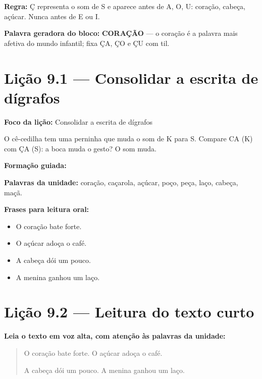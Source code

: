 \textbf{Regra:} Ç representa o som de S e aparece antes de A, O, U: coração, cabeça, açúcar. Nunca antes de E ou I.

\textbf{Palavra geradora do bloco:} \textbf{CORAÇÃO} --- o coração é a palavra mais afetiva do mundo infantil; fixa ÇA, ÇO e ÇU com til.

\section{Lição 9.1 --- Consolidar a escrita de dígrafos}

\textbf{Foco da lição:} Consolidar a escrita de dígrafos


\begin{boquinha}
O cê-cedilha tem uma perninha que muda o som de K para S. Compare CA (K) com ÇA (S): a boca muda o gesto? O som muda.
\end{boquinha}

\noindent\textbf{Formação guiada:}

\begin{center}
\end{center}

\noindent\textbf{Palavras da unidade:} coração, caçarola, açúcar, poço, peça, laço, cabeça, maçã.

\noindent\textbf{Frases para leitura oral:}
\begin{itemize}[leftmargin=1.6em]
  \item O coração bate forte.
  \item O açúcar adoça o café.
  \item A cabeça dói um pouco.
  \item A menina ganhou um laço.
\end{itemize}

\section{Lição 9.2 --- Leitura do texto curto}

\noindent\textbf{Leia o texto em voz alta, com atenção às palavras da unidade:}


\begin{quote}
O coração bate forte. O açúcar adoça o café.

A cabeça dói um pouco. A menina ganhou um laço.
\end{quote}

